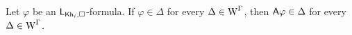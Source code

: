 \medskip

\begin{proposition}\label{pro:cm-ults-khiml-allall}
Let $\varphi$ be an $\mathsf{L}_{{\sf Kh}_i,\square}$-formula. If $\varphi \in \Delta$ for every $\Delta \in \operatorname{W}^\Gamma$, then ${\sf A}\varphi \in \Delta$ for every $\Delta \in \operatorname{W}^\Gamma$.
\end{proposition}








